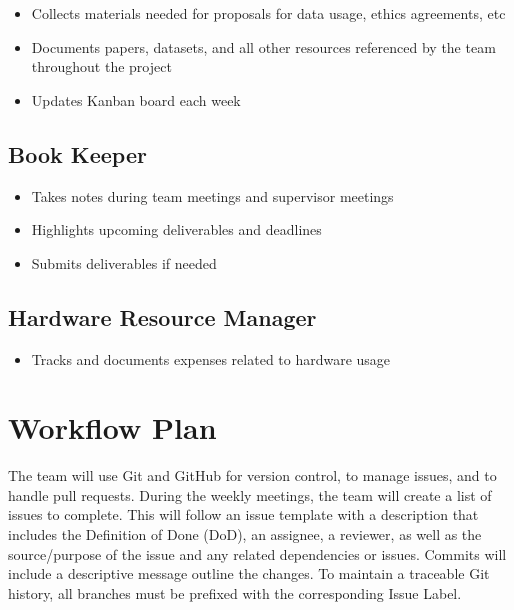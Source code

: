 \documentclass{article}
\begin{document}
\begin{itemize}
  \item Collects materials needed for proposals for data usage, ethics agreements, etc
  \item Documents papers, datasets, and all other resources referenced by the team throughout the project
  \item Updates Kanban board each week
\end{itemize}

\subsection{Book Keeper}

\begin{itemize}
  \item Takes notes during team meetings and supervisor meetings
  \item Highlights upcoming deliverables and deadlines
  \item Submits deliverables if needed
\end{itemize}

\subsection{Hardware Resource Manager }

\begin{itemize}
  \item Tracks and documents expenses related to hardware usage
\end{itemize}


\section{Workflow Plan}

  \begin{comment}
	\item How will you be using git, including branches, pull request, etc.?
	\item How will you be managing issues, including template issues, issue
	classification, etc.?
  \item Use of CI/CD
  \item 
\end{comment}

The team will use Git and GitHub for version control, to manage issues, and to handle pull requests. During the weekly meetings, the team will create a list of issues to complete. This will follow an issue template with a description that includes the Definition of Done (DoD), an assignee, a reviewer, as well as the source/purpose of the issue and any related dependencies or issues. Commits will include a descriptive message outline the changes. To maintain a traceable Git history, all branches must be prefixed with the corresponding Issue Label.
\end{document}
